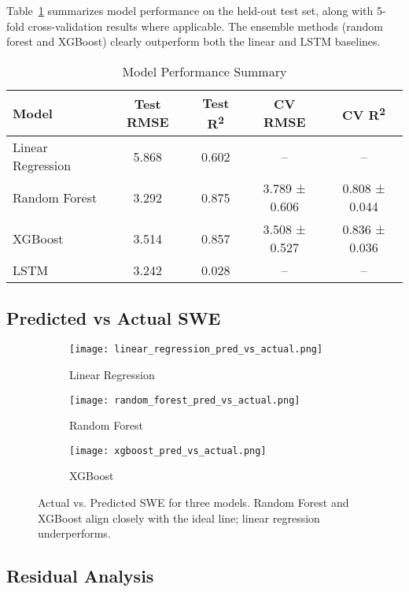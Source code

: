 \documentclass{article}
\begin{document}
Table~\ref{tab:metrics} summarizes model performance on the held-out test set, along with 5-fold cross-validation results where applicable. The ensemble methods (random forest and XGBoost) clearly outperform both the linear and LSTM baselines.

\begin{table} [H]
\centering
\caption{Model Performance Summary}
\label{tab:metrics}
\begin{tabular}{lcccc}
\toprule
\textbf{Model} & \textbf{Test RMSE} & \textbf{Test R\textsuperscript{2}} & \textbf{CV RMSE} & \textbf{CV R\textsuperscript{2}} \\
\midrule
Linear Regression & 5.868 & 0.602 & -- & -- \\
Random Forest & 3.292 & 0.875 & 3.789 ± 0.606 & 0.808 ± 0.044 \\
XGBoost & 3.514 & 0.857 & 3.508 ± 0.527 & 0.836 ± 0.036 \\
LSTM & 3.242 & 0.028 & -- & -- \\
\bottomrule
\end{tabular}
\end{table}

\subsection{Predicted vs Actual SWE}

\begin{figure} [H]
    \centering
    \begin{subfigure}{0.32\linewidth}
        \centering
        \texttt{[image: linear\_regression\_pred\_vs\_actual.png]}
        \caption{Linear Regression}
    \end{subfigure}
    \begin{subfigure}{0.32\linewidth}
        \centering
        \texttt{[image: random\_forest\_pred\_vs\_actual.png]}
        \caption{Random Forest}
    \end{subfigure}
    \begin{subfigure}{0.32\linewidth}
        \centering
        \texttt{[image: xgboost\_pred\_vs\_actual.png]}
        \caption{XGBoost}
    \end{subfigure}
    \caption{Actual vs. Predicted SWE for three models. Random Forest and XGBoost align closely with the ideal line; linear regression underperforms.}
    \label{fig:pred_vs_actual}
\end{figure}

\subsection{Residual Analysis}
\end{document}
